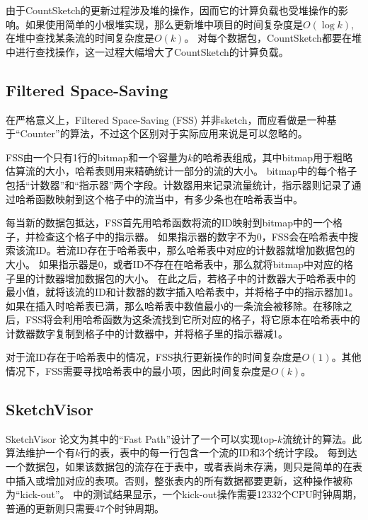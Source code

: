 由于CountSketch的更新过程涉及堆的操作，因而它的计算负载也受堆操作的影响。如果使用简单的小根堆实现，那么更新堆中项目的时间复杂度是$O(\log{k})$, 在堆中查找某条流的时间复杂度是$O(k)$。
对每个数据包，CountSketch都要在堆中进行查找操作，这一过程大幅增大了CountSketch的计算负载。



\subsection{Filtered Space-Saving \cite{homem2010finding}}\label{sec:FSS}
在严格意义上，Filtered Space-Saving (FSS) \cite{homem2010finding}并非sketch，而应看做是一种基于“Counter”的算法，不过这个区别对于实际应用来说是可以忽略的。

FSS由一个只有1行的bitmap和一个容量为$k$的哈希表组成，其中bitmap用于粗略估算流的大小，哈希表则用来精确统计一部分的流的大小。
bitmap中的每个格子包括“计数器”和“指示器”两个字段。计数器用来记录流量统计，指示器则记录了通过哈希函数映射到这个格子中的流当中，有多少条也在哈希表当中。

每当新的数据包抵达，FSS首先用哈希函数将流的ID映射到bitmap中的一个格子，并检查这个格子中的指示器。
如果指示器的数字不为0，FSS会在哈希表中搜索该流ID。若流ID存在于哈希表中，那么哈希表中对应的计数器就增加数据包的大小。
如果指示器是0，或者ID不存在在哈希表中，那么就将bitmap中对应的格子里的计数器增加数据包的大小。
在此之后，若格子中的计数器大于哈希表中的最小值，就将该流的ID和计数器的数字插入哈希表中，并将格子中的指示器加1。
如果在插入时哈希表已满，那么哈希表中数值最小的一条流会被移除。在移除之后，FSS将会利用哈希函数为这条流找到它所对应的格子，将它原本在哈希表中的计数器数字复制到格子中的计数器中，并将格子里的指示器减1。

对于流ID存在于哈希表中的情况，FSS执行更新操作的时间复杂度是$O(1)$。其他情况下，FSS需要寻找哈希表中的最小项，因此时间复杂度是$O(k)$。


\subsection{SketchVisor \cite{huang2017sketchvisor}}\label{subsec:sketchvisor}

SketchVisor \cite{huang2017sketchvisor}论文为其中的“Fast Path”设计了一个可以实现top-$k$流统计的算法。此算法维护一个有$k$行的表，表中的每一行包含一个流的ID和3个统计字段。
每到达一个数据包，如果该数据包的流存在于表中，或者表尚未存满，则只是简单的在表中插入或增加对应的表项。否则，整张表内的所有数据都要更新，这种操作被称为“kick-out”。
\cite{huang2017sketchvisor}中的测试结果显示，一个kick-out操作需要12332个CPU时钟周期，普通的更新则只需要47个时钟周期。

